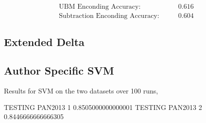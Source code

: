 \begin{align}
\text{UBM Enconding Accuracy}:&\qquad 0.616\\
\text{Subtraction Enconding Accuracy}:& \qquad 0.604
\end{align}

\subsection{Extended Delta}

\subsection{Author Specific SVM}

Results for SVM on the two datasets over 100 runs,

TESTING PAN2013 1
0.8505000000000001
TESTING PAN2013 2
0.8446666666666305
